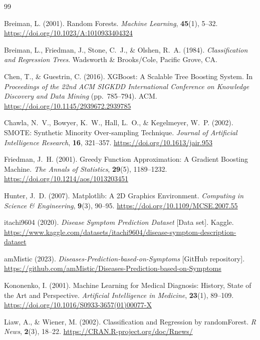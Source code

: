 \documentclass[12pt,a4paper]{article}
\begin{document}
\begin{thebibliography}{99}

Breiman, L. (2001).
Random Forests.
\textit{Machine Learning}, \textbf{45}(1), 5--32.
\url{https://doi.org/10.1023/A:1010933404324}

Breiman, L., Friedman, J., Stone, C.~J., \& Olshen, R.~A. (1984).
\textit{Classification and Regression Trees}.
Wadsworth \& Brooks/Cole, Pacific Grove, CA.

Chen, T., \& Guestrin, C. (2016).
XGBoost: A Scalable Tree Boosting System.
In \textit{Proceedings of the 22nd ACM SIGKDD International Conference on
Knowledge Discovery and Data Mining} (pp.\ 785--794). ACM.
\url{https://doi.org/10.1145/2939672.2939785}

Chawla, N.~V., Bowyer, K.~W., Hall, L.~O., \& Kegelmeyer, W.~P. (2002).
SMOTE: Synthetic Minority Over-sampling Technique.
\textit{Journal of Artificial Intelligence Research}, \textbf{16}, 321--357.
\url{https://doi.org/10.1613/jair.953}

Friedman, J.~H. (2001).
Greedy Function Approximation: A Gradient Boosting Machine.
\textit{The Annals of Statistics}, \textbf{29}(5), 1189--1232.
\url{https://doi.org/10.1214/aos/1013203451}

Hunter, J.~D. (2007).
Matplotlib: A 2D Graphics Environment.
\textit{Computing in Science \& Engineering}, \textbf{9}(3), 90--95.
\url{https://doi.org/10.1109/MCSE.2007.55}

itachi9604 (2020).
\textit{Disease Symptom Prediction Dataset} [Data set].
Kaggle.
\url{https://www.kaggle.com/datasets/itachi9604/disease-symptom-description-dataset}

amMistic (2023).
\textit{Diseases-Prediction-based-on-Symptoms} [GitHub repository].
\url{https://github.com/amMistic/Diseases-Prediction-based-on-Symptoms}

Kononenko, I. (2001).
Machine Learning for Medical Diagnosis: History, State of the Art and Perspective.
\textit{Artificial Intelligence in Medicine}, \textbf{23}(1), 89--109.
\url{https://doi.org/10.1016/S0933-3657(01)00077-X}

Liaw, A., \& Wiener, M. (2002).
Classification and Regression by randomForest.
\textit{R News}, \textbf{2}(3), 18--22.
\url{https://CRAN.R-project.org/doc/Rnews/}


\end{thebibliography}
\end{document}
